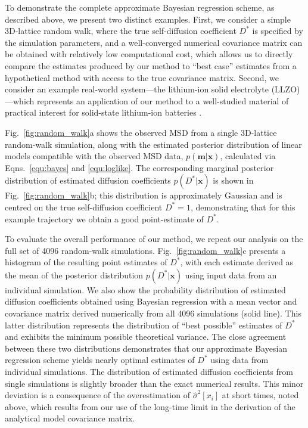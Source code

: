\documentclass[reprint,superscriptaddress,nobibnotes,amsmath,amssymb,aps,prx,hidelinks,linenumbers]{revtex4-2}
\newcommand{\oMSD}{\ensuremath{\bm{x}}}
\newcommand{\oMSDi}{\ensuremath{x_i}}
\newcommand{\model}{\bm{m}}
\newcommand{\prob}[1]{\ensuremath{p(#1)}}
\newcommand{\D}{\ensuremath{D^*}}
\newcommand{\varest}[1]{\ensuremath{\widehat{\sigma}^2[#1]}}
\begin{document}
To demonstrate the complete approximate Bayesian regression scheme, as described above, we present two distinct examples.
First, we consider a simple 3D-lattice random walk, where the true self-diffusion coefficient $\D$ is specified by the simulation parameters, and a well-converged numerical covariance matrix can be obtained with relatively low computational cost, which allows us to directly compare the estimates produced by our method to ``best case'' estimates from a hypothetical method with access to the true covariance matrix.
Second, we consider an example real-world system---the lithium-ion solid electrolyte  (LLZO)---which represents an application of our method to a well-studied material of practical interest for solid-state lithium-ion batteries \cite{MuruganEtAl_AngewChemIntEd2007,burbano_sparse_2016,morgan_lattice_2017,SquiresEtAl_PhysRevMater2022}.

Fig.~\ref{fig:random_walk}a shows the observed MSD from a single 3D-lattice random-walk simulation, along with the estimated posterior distribution of linear models compatible with the observed MSD data, $\prob{\model|\oMSD}$, calculated via Eqns.~\ref{equ:bayes} and \ref{equ:loglike}.
The corresponding marginal posterior distribution of estimated diffusion coefficients $\prob{\D|\oMSD}$ is shown in Fig.~\ref{fig:random_walk}b; this distribution is approximately Gaussian and is centred on the true self-diffusion coefficient $\D = \num{1}$, demonstrating that for this example trajectory we obtain a good point-estimate of $\D$.

To evaluate the overall performance of our method, we repeat our analysis on the full set of \num{4096} random-walk simulations.
Fig.~\ref{fig:random_walk}c presents a histogram of the resulting point estimates of $\D$, with each estimate derived as the mean of the posterior distribution $\prob{\D|\oMSD}$ using input data from an individual simulation.
We also show the probability distribution of estimated diffusion coefficients obtained using Bayesian regression with a mean vector and covariance matrix derived numerically from all \num{4096} simulations (solid line).
This latter distribution represents the distribution of ``best possible'' estimates of $\D$ and exhibits the minimum possible theoretical variance.
The close agreement between these two distributions demonstrates that our approximate Bayesian regression scheme yields nearly optimal estimates of $\D$ using data from individual simulations.
The distribution of estimated diffusion coefficients from single simulations is slightly broader than the exact numerical results.
This minor deviation is a consequence of the overestimation of $\varest{\oMSDi}$ at short times, noted above, which results from our use of the long-time limit in the derivation of the analytical model covariance matrix.
\end{document}
